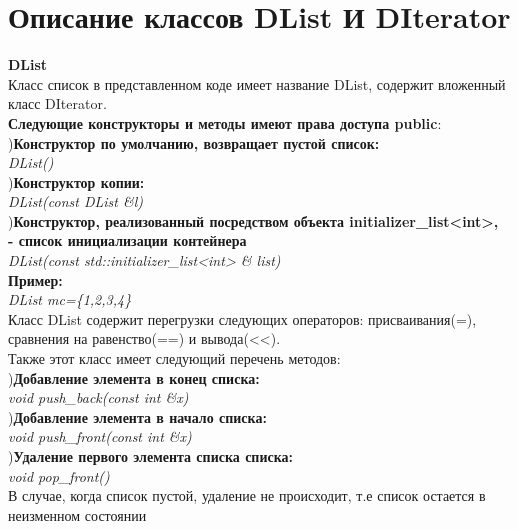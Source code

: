 \documentclass[a4paper]{article}
\begin{document}
	\newpage %
	{\section{Описание классов DList И DIterator}
	{\LARGE \bf DList}\\
	\hfill\break
	Класс список в представленном коде имеет название DList, содержит вложенный класс DIterator.\\
	\hfill\break
	{\bf Следующие конструкторы и методы имеют права доступа public}:\\
	\hfill {}){\bf Конструктор по умолчанию, возвращает пустой список:}\\
	     \hfill \break
	     \textit{DList()}\\
	     \hfill \break
	     \hfill {}){\bf Конструктор копии:}\\
	     \hfill \break
	     \textit{DList(const DList \&l)}\\
	     \hfill \break
	     \hfill {}){\bf Конструктор, реализованный посредством объекта initializer\_list<int>,\\
		- список инициализации контейнера}\\
         \hfill \break	
	     \textit{DList(const std::initializer\_list<int> \& list)}\\
	     \hfill\break
	     {\bf Пример:}\\
	     \hfill \break
	     \textit{DList mc=\{1,2,3,4\}}\\
	     \hfill \break
	     \hfill \break
	Класс DList содержит перегрузки следующих операторов: присваивания(=), сравнения на равенство(==) и вывода(<<).\\
	Также этот класс имеет следующий перечень методов:\\
	     \hfill {}){\bf Добавление элемента в конец списка:}\\
	     \hfill \break
	     \textit{void push\_back(const int \&x)}\\
	     \hfill \break
	     \hfill {}){\bf Добавление элемента в начало списка:}\\
	     \hfill \break
	     \textit{void push\_front(const int \&x)}\\
	     \hfill \break
	     \hfill {}){\bf Удаление первого элемента списка списка:}\\
	     \hfill \break
	     \textit{void pop\_front()}\\
	     \hfill \break
	     \hfill \break
	  В случае, когда список пустой, удаление не происходит, т.е список остается в неизменном состоянии\\
}
\end{document}
